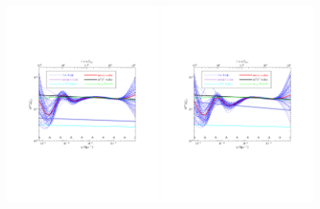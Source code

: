 \documentclass[11pt]{article}
\def \halffigwidth{0.45\textwidth}
\begin{document}
\begin{figure}
  \includegraphics[width=\halffigwidth,  trim = 1in 3in 1in 3in]{nobicep_spline0_p11_r0d2_power_traj.pdf}%
  \includegraphics[width=\halffigwidth,  trim = 1in 3in 1in 3in]{nobicep_spline0_p11_r0d5_power_traj.pdf}

\end{figure}
\end{document}
